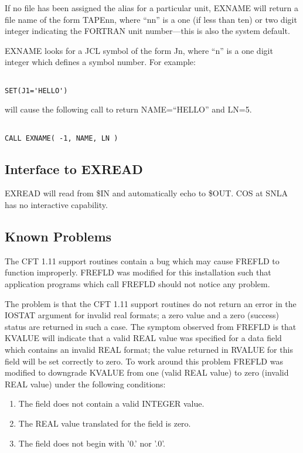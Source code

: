If no file has been assigned the alias for a particular unit, EXNAME will
return a file name of the form TAPEnn, where ``nn'' is a one (if less than
ten) or two digit integer indicating the FORTRAN unit number---this is also the
system default.

EXNAME looks for a JCL symbol of the form Jn, where ``n'' is a one digit
integer which defines a symbol number.  For example:
\begin{verbatim}

SET(J1='HELLO')

\end{verbatim}
will cause the following call to return NAME=``HELLO'' and LN=5.
\begin{verbatim}

CALL EXNAME( -1, NAME, LN )
\end{verbatim}

\subsection{Interface to EXREAD}
EXREAD will read from \$IN and automatically echo to \$OUT.  COS at SNLA has
no interactive capability.

\subsection{Known Problems}
The CFT 1.11 support routines contain a bug which may cause FREFLD to
function improperly.  FREFLD was modified for this installation such that
application programs which call FREFLD should not notice any problem.

The problem is that the CFT 1.11 support routines do not return an error in
the IOSTAT argument for invalid real formats; a zero value and a zero
(success) status are returned in such a case.  The symptom observed from
FREFLD is that KVALUE will indicate that a valid REAL value was specified
for a data field which contains an invalid REAL format; the value returned
in RVALUE for this field will be set correctly to zero.  To work around this
problem FREFLD was modified to downgrade KVALUE from one (valid REAL value)
to zero (invalid REAL value) under the following conditions:
\begin{enumerate}
\item The field does not contain a valid INTEGER value.
\item The REAL value translated for the field is zero.
\item The field does not begin with '0.' nor '.0'.
\end{enumerate}

